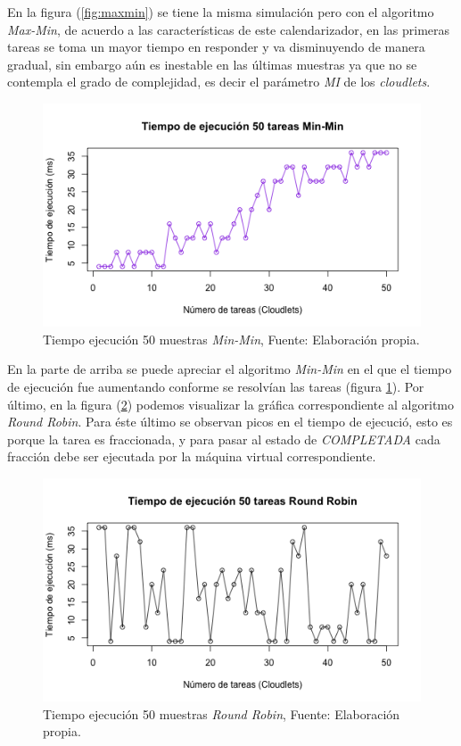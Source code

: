 \documentclass[jou,apacite]{apa6}
\begin{document}
 En la figura (\ref{fig:maxmin}) se tiene la misma simulaci\'on pero con el algoritmo \textit{Max-Min}, de acuerdo a las caracter\'isticas de este calendarizador, en las primeras tareas se toma un mayor tiempo en responder y va disminuyendo de manera gradual, sin embargo a\'un es inestable en las \'ultimas muestras ya que no se contempla el grado de complejidad, es decir el par\'ametro \textit{MI} de los \textit{cloudlets}.

 \renewcommand\thefigure{\arabic{figure}}
\begin{figure}[h!] 
	\centering
	\includegraphics[scale=0.5]{media/minmin}
	\caption{Tiempo ejecuci\'on 50 muestras \textit{Min-Min}, Fuente: Elaboraci\'on propia.}
	\label{fig:minmin}
\end{figure}

En la parte de arriba se puede apreciar el algoritmo \textit{Min-Min} en el que el tiempo de ejecuci\'on fue aumentando conforme se resolv\'ian las tareas (figura \ref{fig:minmin}). Por último, en la figura (\ref{fig:roundrobin}) podemos visualizar la gráfica correspondiente al algoritmo \textit{Round Robin}. Para éste último se observan picos en el tiempo de ejecució, esto es porque la tarea es fraccionada, y para pasar al estado de \textit{COMPLETADA} cada fracción debe ser ejecutada por la máquina virtual correspondiente.


\renewcommand\thefigure{\arabic{figure}}
\begin{figure}[h!] 
	\centering
	\includegraphics[scale=0.5]{media/roundrobin}
	\caption{Tiempo ejecuci\'on 50 muestras \textit{Round Robin}, Fuente: Elaboraci\'on propia.}
	\label{fig:roundrobin}
\end{figure}
\end{document}
